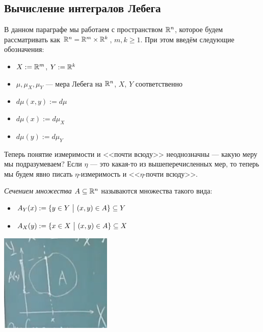 \subsection{Вычисление интегралов Лебега}

\begin{note}
	В данном параграфе мы работаем с пространством $\mathbb{R}^n$, которое будем рассматривать как $\mathbb{R}^n = \mathbb{R}^m \times \mathbb{R}^k$, $m, k \ge 1$. При этом введём следующие обозначения:
	\begin{itemize}
		\item $X := \mathbb{R}^m$, $Y := \mathbb{R}^k$
		
		\item $\mu, \mu_X, \mu_Y$ --- мера Лебега на $\mathbb{R}^n$, $X$, $Y$ соответственно
		
		\item $d\mu(x, y) := d\mu$
		
		\item $d\mu(x) := d\mu_X$
		
		\item $d\mu(y) := d\mu_Y$
	\end{itemize}
	Теперь понятие измеримости и <<почти всюду>> неоднозначны --- какую меру мы подразумеваем? Если $\eta$ --- это какая-то из вышеперечисленных мер, то теперь мы будем явно писать $\eta$-измеримость и <<$\eta$-почти всюду>>.
\end{note}

\begin{definition}
	\textit{Сечением множества} $A \subseteq \mathbb{R}^n$ называются множества такого вида:
	\begin{itemize}
		\item $A_Y(x) := \{y \in Y \ \big|\  (x, y) \in A\} \subseteq Y$
		
		\item $A_X(y) := \{x \in X \ \big|\  (x, y) \in A\} \subseteq X$
	\end{itemize}
\end{definition}

\begin{center}
	\includegraphics[width=0.4\textwidth]{images/section.png}
\end{center}

